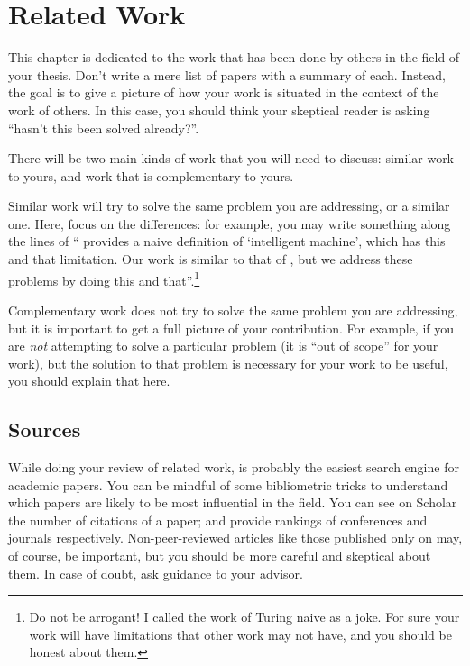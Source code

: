\chapter{Related Work}
\label{sec:related}

This chapter is dedicated to the work that has been done by others in the field of your thesis.
Don't write a mere list of papers with a summary of each. Instead, the goal is to give a picture
of how your work is situated in the context of the work of others. In this case, you should
think your skeptical reader is asking ``hasn't this been solved already?''.

There will be two main kinds of work that you will need to discuss: similar work
to yours, and work that is complementary to yours.

Similar work will try to solve the same problem you are addressing, or a similar one.
Here, focus on the differences: for example, you may write something along the
lines of ``\textcite{DBLP:journals/x/Turing50} provides a naive definition of
`intelligent machine', which has this and that limitation. Our work is similar to that of
\citeauthor{DBLP:journals/x/Turing50}, but we address these problems by doing this and
that''.\footnote{Do not be arrogant! I called the work of Turing naive as a joke.
For sure your work will have limitations that other work may not have, and you should be honest about them.}

Complementary work does not try to solve the same problem you are addressing, but it is
important to get a full picture of your contribution. For example, if you are
\emph{not} attempting to solve a particular problem (it is ``out of scope'' for your work),
but the solution to that problem is necessary for your work to be useful, you should explain
that here.

\section{Sources}

While doing your review of related work, 
is probably the easiest search engine for academic papers. You can be mindful of some
bibliometric tricks to understand which papers are likely to be most influential in the field.
You can see on Scholar the number of citations of a paper;
 and
 provide rankings of conferences and journals
respectively. Non-peer-reviewed articles like those published only on
 may, of course, be important, but you should be more careful
and skeptical about them. In case of doubt, ask guidance to your advisor.

